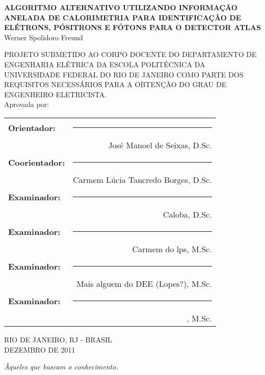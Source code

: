 \begin{titlepage}
	\begin{center}
		{\large \uppercase{\bf{Algoritmo Alternativo utilizando informação anelada
de calorimetria para identificação de elétrons, pósitrons e fótons para 
o detector ATLAS}}}\\[0.9cm]
    {Werner Spolidoro Freund}\\[0.9cm]
  \end{center}

		{\uppercase{\footnotesize{PROJETO SUBMETIDO AO CORPO DOCENTE DO DEPARTAMENTO 
DE ENGENHARIA ELÉTRICA DA ESCOLA POLITÉCNICA DA UNIVERSIDADE FEDERAL DO RIO 
DE JANEIRO COMO PARTE DOS REQUISITOS NECESSÁRIOS PARA A OBTENÇÃO DO GRAU 
DE ENGENHEIRO ELETRICISTA.}}}\\[0.3cm]

    {Aprovada por:}

  \begin{flushright}
		\begin{tabular}{lr}
			{\bf Orientador:} & \rule{8cm}{0.4pt} \\
					 & José Manoel de Seixas, D.Sc. \\[0.5cm]
			{\bf Coorientador:}& \rule{8cm}{0.4pt} \\ 
					 & Carmem Lúcia Tancredo Borges, D.Sc. \\[0.5cm]
			{\bf Examinador:}& \rule{8cm}{0.4pt} \\
					 & Caloba, D.Sc. \\[0.5cm]
			{\bf Examinador:}& \rule{8cm}{0.4pt} \\
					 & Carmem do lps, M.Sc. \\[0.5cm]
			{\bf Examinador:}& \rule{8cm}{0.4pt} \\
					 & Mais alguem do DEE (Lopes?), M.Sc. \\[0.5cm]
			{\bf Examinador:}& \rule{8cm}{0.4pt} \\
					 & ,  M.Sc. \\[0.5cm]
		\end{tabular}
	\end{flushright}
  \vfill
  \begin{center}
		\begin{large}
      \uppercase{
			RIO DE JANEIRO, RJ - BRASIL \\
      DEZEMBRO DE 2011}
		\end{large}
  \end{center}
\end{titlepage}

\cleardoublepage

\null
\vfill
\begin{flushright}
  \em{Àqueles que buscam o conhecimento.}\\
\end{flushright}
